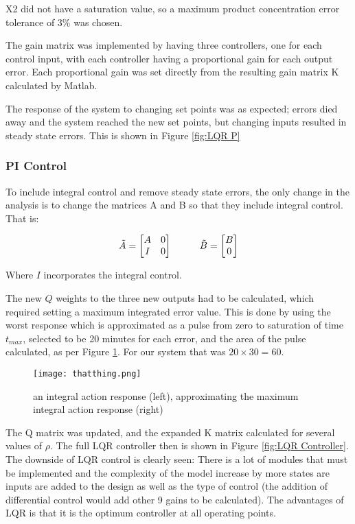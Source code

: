 \documentclass[11pt]{article}
\begin{document}
X2 did not have a saturation value, so a maximum product concentration error tolerance of 3\% was chosen. 

The gain matrix was implemented by having three controllers, one for each control input, with each
controller having a proportional gain for each output error. Each proportional gain was set directly from the resulting gain matrix K calculated by Matlab.

The response of the system to changing set points was as expected; errors died away and the system
reached the new set points, but changing inputs resulted in steady state errors. This is shown in Figure \ref{fig:LQR P}


\subsubsection{PI Control}
To include integral control and remove steady state errors, the only change in the analysis is to change the matrices A and B so that they include integral control. That is:

\[ 
\Tilde{A} = 
\begin{bmatrix}
    A & 0\\
    I & 0
\end{bmatrix}
\hspace{1cm}
\Tilde{B} =
\begin{bmatrix}
    B \\ 0
\end{bmatrix}
\]

Where $I$ incorporates the integral control. 

The new $Q$ weights to the three new outputs had to be calculated, which required setting
a maximum integrated error value. This is done by using the worst response which is approximated as a pulse from
zero to saturation of time $t_{max}$, selected to be 20 minutes for each error, and the area of
the pulse calculated, as per Figure \ref{fig:area}. For our system that was $20\times30 = 60$.

\begin{figure}[H]
    \centering
    \texttt{[image: thatthing.png]}
    \caption{an integral action response (left), approximating the maximum integral action response
    (right)}
    \label{fig:area}
\end{figure}

The Q matrix was updated, and the expanded K matrix calculated for several values of $\rho$.  The full LQR controller then is shown in Figure \ref{fig:LQR Controller}. The downside of LQR control is clearly seen: There is a lot of modules that must be implemented and the complexity of the model increase by more states are inputs are added to the design as well as the type of control (the addition of differential control would add other 9 gains to be calculated). The advantages of LQR is that it is the optimum controller at all operating points. 
\end{document}
